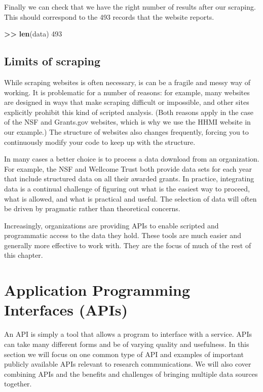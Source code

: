 \documentclass[]{krantz}
\newenvironment{Shaded}{\begin{snugshade}}{\end{snugshade}}
\newcommand{\KeywordTok}[1]{\textcolor[rgb]{0.13,0.29,0.53}{\textbf{#1}}}
\newcommand{\DecValTok}[1]{\textcolor[rgb]{0.00,0.00,0.81}{#1}}
\newcommand{\StringTok}[1]{\textcolor[rgb]{0.31,0.60,0.02}{#1}}
\newcommand{\OperatorTok}[1]{\textcolor[rgb]{0.81,0.36,0.00}{\textbf{#1}}}
\newcommand{\ErrorTok}[1]{\textcolor[rgb]{0.64,0.00,0.00}{\textbf{#1}}}
\newcommand{\NormalTok}[1]{#1}
\begin{document}
Finally we can check that we have the right number of results after our
scraping. This should correspond to the 493 records that the website
reports.

\begin{Shaded}
\begin{Highlighting}[]
\OperatorTok{>}\ErrorTok{>}\StringTok{ }\KeywordTok{len}\NormalTok{(data)}
\DecValTok{493}
\end{Highlighting}
\end{Shaded}

\subsection{Limits of scraping}\label{sec:4-1.2}

While scraping websites is often necessary, is can be a fragile and
messy way of working. It is problematic for a number of reasons: for
example, many websites are designed in ways that make scraping difficult
or impossible, and other sites explicitly prohibit this kind of scripted
analysis. (Both reasons apply in the case of the NSF and Grants.gov
websites, which is why we use the HHMI website in our example.) The
structure of websites also changes frequently, forcing you to
continuously modify your code to keep up with the structure.

In many cases a better choice is to process a data download from an
organization. For example, the NSF and Wellcome Trust both provide data
sets for each year that include structured data on all their awarded
grants. In practice, integrating data is a continual challenge of
figuring out what is the easiest way to proceed, what is allowed, and
what is practical and useful. The selection of data will often be driven
by pragmatic rather than theoretical concerns.

Increasingly, organizations are providing APIs to enable scripted and
programmatic access to the data they hold. These tools are much easier
and generally more effective to work with. They are the focus of much of
the rest of this chapter.

\section{Application Programming Interfaces (APIs)}\label{sec:4-3}

An API is simply a tool that allows a program to interface with a
service. APIs can take many different forms and be of varying quality
and usefulness. In this section we will focus on one common type of API
and examples of important publicly available APIs relevant to research
communications. We will also cover combining APIs and the benefits and
challenges of bringing multiple data sources together.
\end{document}
